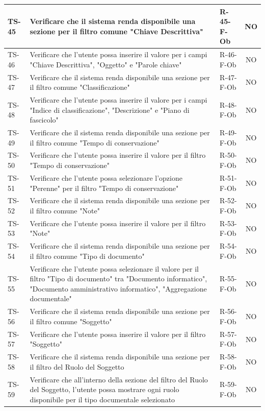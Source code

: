 \documentclass[a4paper,12pt]{article}
\begin{document}
\begin{longtable}{|p{1.5cm}|p{8.3cm}|p{2.4cm}|c|}
\hline
TS-45 & Verificare che il sistema renda disponibile una sezione per il filtro comune "Chiave Descrittiva" & R-45-F-Ob & NO \\
\hline
TS-46 & Verificare che l'utente possa inserire il valore per i campi "Chiave Descrittiva", "Oggetto" e "Parole chiave" & R-46-F-Ob & NO \\
\hline
TS-47 & Verificare che il sistema renda disponibile una sezione per il filtro comune "Classificazione" & R-47-F-Ob & NO \\
\hline
TS-48 & Verificare che l'utente possa inserire il valore per i campi "Indice di classificazione", "Descrizione" e "Piano di fascicolo" & R-48-F-Ob & NO \\
\hline
TS-49 & Verificare che il sistema renda disponibile una sezione per il filtro comune "Tempo di conservazione" & R-49-F-Ob & NO \\
\hline
TS-50 & Verificare che l'utente possa inserire il valore per il filtro "Tempo di conservazione" & R-50-F-Ob & NO \\
\hline
TS-51 & Verificare che l'utente possa selezionare l'opzione "Perenne" per il filtro "Tempo di conservazione" & R-51-F-Ob & NO \\
\hline
TS-52 & Verificare che il sistema renda disponibile una sezione per il filtro comune "Note" & R-52-F-Ob & NO \\
\hline
TS-53 & Verificare che l'utente possa inserire il valore per il filtro "Note" & R-53-F-Ob & NO \\
\hline
TS-54 & Verificare che il sistema renda disponibile una sezione per il filtro comune "Tipo di documento" & R-54-F-Ob & NO \\
\hline
TS-55 & Verificare che l'utente possa selezionare il valore per il filtro "Tipo di documento" tra "Documento informatico", "Documento amministrativo informatico", "Aggregazione documentale" & R-55-F-Ob & NO \\
\hline
TS-56 & Verificare che il sistema renda disponibile una sezione per il filtro comune "Soggetto" & R-56-F-Ob & NO \\
\hline
TS-57 & Verificare che l'utente possa inserire il valore per il filtro "Soggetto" & R-57-F-Ob & NO \\
\hline
TS-58 & Verificare che il sistema renda disponibile una sezione per il filtro del Ruolo del Soggetto & R-58-F-Ob & NO \\
\hline
TS-59 & Verificare che all'interno della sezione del filtro del Ruolo del Soggetto, l'utente possa mostrare ogni ruolo disponibile per il tipo documentale selezionato & R-59-F-Ob & NO \\

\end{longtable}
\end{document}
